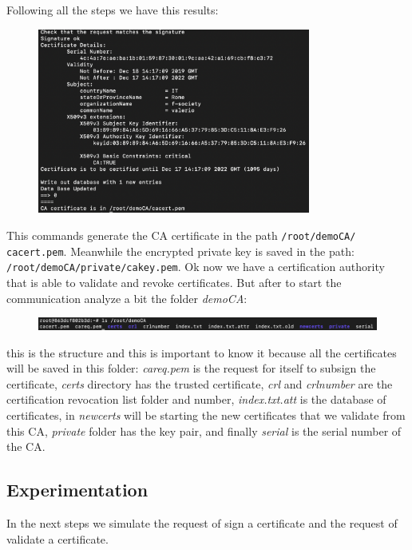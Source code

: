 \documentclass[11pt]{article}
\begin{document}
Following all the steps we have this results:

\begin{figure}[!ht]
  \centering
  \includegraphics[width=0.8\textwidth]{pic3-hw6-7-1635747.png}
  \label{fig:results}
\end{figure}

This commands generate the CA certificate in the path \texttt{/root/demoCA/ cacert.pem}. Meanwhile the encrypted private key is saved in the path: \texttt{/root/demoCA/private/cakey.pem}. Ok now we have a certification authority that is able to validate and revoke certificates. But after to start the communication analyze a bit the folder {\em demoCA}:

\begin{figure}[!ht]
  \includegraphics[width=1\textwidth]{pic4-hw6-7-1635747}
  \label{fig:demoCA}
\end{figure}

this is the structure and this is important to know it because all the certificates will be saved in this folder: {\em careq.pem} is the request for itself to subsign the certificate, {\em certs} directory has the trusted certificate, {\em crl} and {\em crlnumber} are the certification revocation list folder and number, {\em index.txt.att} is the database of certificates, in {\em newcerts} will be starting the new certificates that we validate from this CA, {\em private} folder has the key pair, and finally {\em serial} is the serial number of the CA.

\newpage
\subsection{Experimentation}
In the next steps we simulate the request of sign a certificate and the request of validate a certificate.
\end{document}
